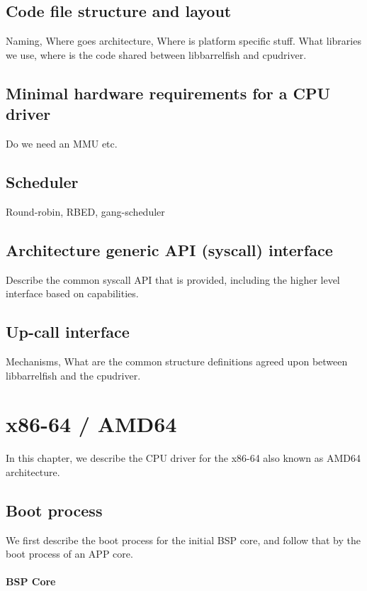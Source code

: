 \documentclass[a4paper,11pt,twoside]{report}
\begin{document}
{{\section{Code file structure and layout}
Naming, Where goes architecture, Where is platform specific stuff.
What libraries we use, where is the code shared between libbarrelfish
and cpudriver.

\section{Minimal hardware requirements for a CPU driver}
Do we need an MMU etc.

\section{Scheduler}
Round-robin, RBED, gang-scheduler

\section{Architecture generic API (syscall) interface}
Describe the common syscall API that is provided, including
the higher level interface based on capabilities.

\section{Up-call interface}
Mechanisms, What are the common structure definitions agreed upon between
libbarrelfish and the cpudriver.



\chapter{x86-64 / AMD64}
\label{chap:x86}

In this chapter, we describe the CPU driver for the x86-64 also known as AMD64
architecture.

\section{Boot process}
We first describe the boot process for the initial BSP core,
and follow that by the boot process of an APP core.

\subsubsection{BSP Core}

}}
\end{document}
